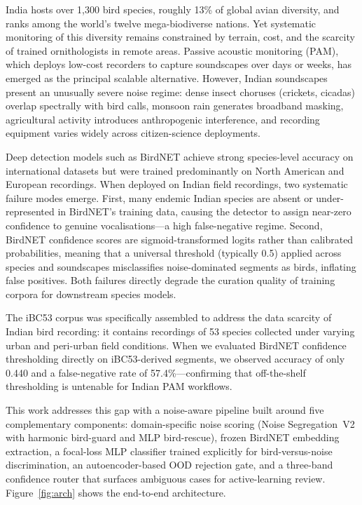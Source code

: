 \documentclass[conference]{IEEEtran}
\begin{document}
India hosts over 1,300 bird species, roughly 13\% of global avian diversity, and ranks among the world's twelve mega-biodiverse nations. Yet systematic monitoring of this diversity remains constrained by terrain, cost, and the scarcity of trained ornithologists in remote areas. Passive acoustic monitoring (PAM), which deploys low-cost recorders to capture soundscapes over days or weeks, has emerged as the principal scalable alternative. However, Indian soundscapes present an unusually severe noise regime: dense insect choruses (crickets, cicadas) overlap spectrally with bird calls, monsoon rain generates broadband masking, agricultural activity introduces anthropogenic interference, and recording equipment varies widely across citizen-science deployments.

Deep detection models such as BirdNET achieve strong species-level accuracy on international datasets but were trained predominantly on North American and European recordings. When deployed on Indian field recordings, two systematic failure modes emerge. First, many endemic Indian species are absent or under-represented in BirdNET's training data, causing the detector to assign near-zero confidence to genuine vocalisations---a high false-negative regime. Second, BirdNET confidence scores are sigmoid-transformed logits rather than calibrated probabilities, meaning that a universal threshold (typically 0.5) applied across species and soundscapes misclassifies noise-dominated segments as birds, inflating false positives. Both failures directly degrade the curation quality of training corpora for downstream species models.

The iBC53 corpus was specifically assembled to address the data scarcity of Indian bird recording: it contains recordings of 53 species collected under varying urban and peri-urban field conditions. When we evaluated BirdNET confidence thresholding directly on iBC53-derived segments, we observed accuracy of only 0.440 and a false-negative rate of 57.4\%---confirming that off-the-shelf thresholding is untenable for Indian PAM workflows.

This work addresses this gap with a noise-aware pipeline built around five complementary components: domain-specific noise scoring (Noise Segregation~V2 with harmonic bird-guard and MLP bird-rescue), frozen BirdNET embedding extraction, a focal-loss MLP classifier trained explicitly for bird-versus-noise discrimination, an autoencoder-based OOD rejection gate, and a three-band confidence router that surfaces ambiguous cases for active-learning review. Figure~\ref{fig:arch} shows the end-to-end architecture.
\end{document}
